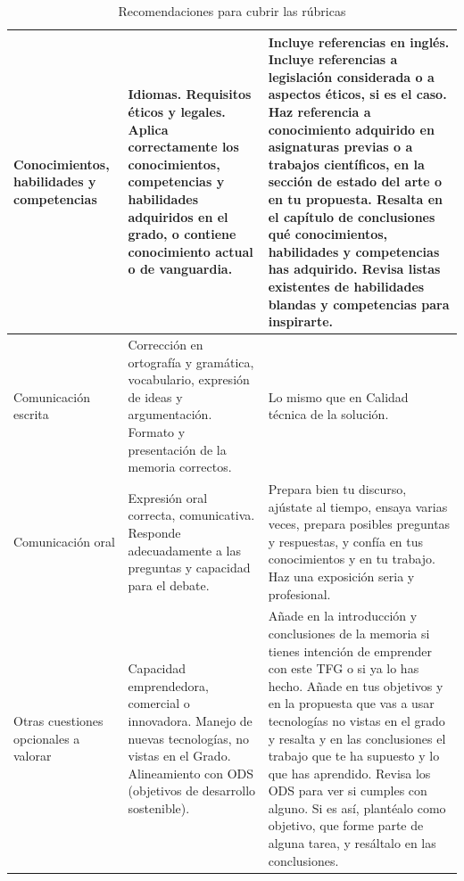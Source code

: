 \begin{table}
{\begin{tabular}{|p{3cm} |p{5cm}| p{15cm}|}
Conocimientos, habilidades y competencias &	Idiomas. Requisitos éticos y legales. Aplica correctamente los conocimientos, competencias y habilidades adquiridos en el grado, o contiene conocimiento actual o de vanguardia. & Incluye referencias en inglés. Incluye referencias a legislación considerada o a aspectos éticos, si es el caso. Haz referencia a conocimiento adquirido en asignaturas previas o a trabajos científicos, en la sección de estado del arte o en tu propuesta. Resalta en el capítulo de conclusiones qué conocimientos, habilidades y competencias has adquirido. Revisa listas existentes de habilidades blandas y competencias para inspirarte.  \\ \hline

Comunicación escrita &	Corrección en ortografía y gramática, vocabulario, expresión de ideas y argumentación. Formato y presentación de la memoria correctos. &  Lo mismo que en Calidad técnica de la solución. \\ \hline

Comunicación oral &	Expresión oral correcta, comunicativa. Responde adecuadamente a las preguntas y capacidad para el debate. & Prepara bien tu discurso, ajústate al tiempo, ensaya varias veces, prepara posibles preguntas y respuestas, y confía en tus conocimientos y en tu trabajo. Haz una exposición seria y profesional. \\ \hline

Otras cuestiones opcionales a valorar & Capacidad emprendedora, comercial o innovadora. Manejo de nuevas tecnologías, no vistas en el Grado. Alineamiento con ODS (objetivos de desarrollo sostenible). & Añade en la introducción y conclusiones de la memoria si tienes intención de emprender con este TFG o si ya lo has hecho. Añade en tus objetivos y en la propuesta que vas a usar tecnologías no vistas en el grado y resalta y en las conclusiones el trabajo que te ha supuesto y lo que has aprendido. Revisa los ODS para ver si cumples con alguno. Si es así, plantéalo como objetivo, que forme parte de alguna tarea, y resáltalo en las conclusiones. \\  \hline
\end{tabular}
}
    \caption{Recomendaciones para cubrir las rúbricas}
    \label{tab:recomendaciones}
\end{table}


